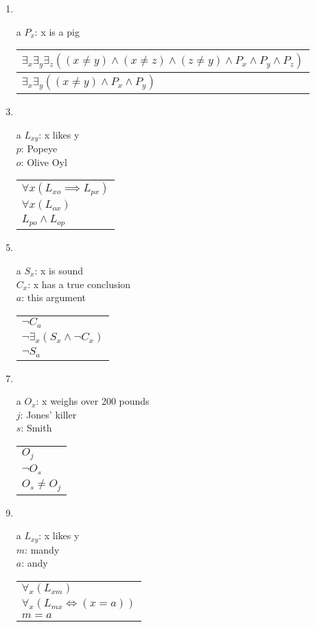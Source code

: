 \documentclass{article}
\begin{document}
\begin{enumerate}
\begin{tabular}{l}
			\end{tabular}
		\item
		\item[a]
			$P_x$: x is a pig\\
			\begin{tabular}{l}
				$\exists _x \exists _y \exists _z ((x \neq y)\land(x \neq z)\land(z \neq y)\land P_x \land P_y \land P_z)$\\ \hline
				$\exists _x \exists _y ((x \neq y)\land P_x \land P_y)$\\
			\end{tabular}
		\item
		\item[a]
			$L_{xy}$: x likes y\\
			$p$: Popeye\\
			$o$: Olive Oyl\\
			\begin{tabular}{l}
				$\forall x (L_{xo} \implies L_{px})$\\
				$\forall x (L_{ox})$\\ \hline
				$L_{po} \land L_{op}$\\
			\end{tabular}
		\item
		\item[a]
			$S_x$: x is sound\\
			$C_x$: x has a true conclusion\\
			$a$: this argument\\
			\begin{tabular}{l}
				$\lnot C_a$\\
				$\lnot \exists _x (S_x \land \lnot C_x)$\\ \hline
				$\lnot S_a$\\
			\end{tabular}
		\item
		\item[a]
			$O_x$: x weighs over 200 pounds\\
			$j$: Jones' killer\\
			$s$: Smith\\
			\begin{tabular}{l}
				$O_j$\\
				$\lnot O_s$\\ \hline
				$O_s \neq O_j$\\
			\end{tabular}

		\item
		\item[a]
			$L_{xy}$: x likes y\\
			$m$: mandy\\
			$a$: andy\\
			\begin{tabular}{l}
				$\forall _x(L_{xm})$\\
				$\forall _x(L_{mx} \iff (x = a))$\\ \hline
				$m = a$
			\end{tabular}


\end{enumerate}
\end{document}
